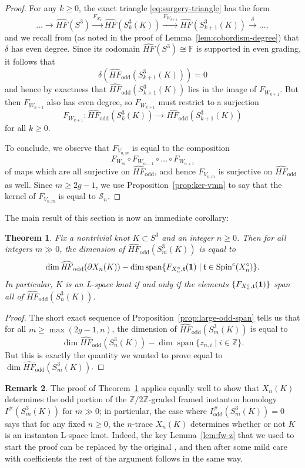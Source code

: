 \documentclass[11pt]{amsart}
\newtheorem {theorem}{Theorem}
\numberwithin{equation}{section}
\numberwithin{theorem}{section}
\theoremstyle{definition}
\newtheorem{remark}[theorem]{Remark}
\newcommand{\Z}{\mathbb{Z}}
\newcommand{\F}{\mathbb{F}}
\newcommand{\spc}{\operatorname{Spin}^c}
\newcommand{\spint}{\mathfrak{t}}
\newcommand{\cS}{\mathcal{S}}
\DeclareMathOperator{\Span}{span}
\newcommand{\hfhat}{\widehat{\mathit{HF}}}
\newcommand{\godd}{\mathrm{odd}}
\begin{document}
\begin{proof}
For any $k \geq 0$, the exact triangle \eqref{eq:surgery-triangle} has the form
\[ \dots \to \hfhat(S^3) \xrightarrow{F_{X^\circ_k}} \hfhat(S^3_k(K)) \xrightarrow{F_{W_{k+1}}} \hfhat(S^3_{k+1}(K)) \xrightarrow{\delta} \dots, \]
and we recall from \cite[\S42.3]{km-book} (as noted in the proof of Lemma~\ref{lem:cobordism-degree}) that $\delta$ has even degree.  Since its codomain $\hfhat(S^3) \cong \F$ is supported in even grading, it follows that
\[ \delta\left(\hfhat_\godd(S^3_{k+1}(K))\right) = 0 \]
and hence by exactness that $\hfhat_\godd(S^3_{k+1}(K))$ lies in the image of $F_{W_{k+1}}$.  But then $F_{W_{k+1}}$ also has even degree, so $F_{W_{k+1}}$ must restrict to a surjection
\[ F_{W_{k+1}}: \hfhat_\godd(S^3_k(K)) \to \hfhat_\godd(S^3_{k+1}(K)) \]
for all $k \geq 0$.

To conclude, we observe that $F_{V_{n,m}}$ is equal to the composition
\[ F_{W_m} \circ F_{W_{m-1}} \circ \dots \circ F_{W_{n+1}} \]
of maps which are all surjective on $\hfhat_\godd$, and hence $F_{V_{n,m}}$ is surjective on $\hfhat_\godd$ as well.  Since $m \geq 2g-1$, we use Proposition~\ref{prop:ker-vmn} to say that the kernel of $F_{V_{n,m}}$ is equal to $\cS_n$.
\end{proof}

The main result of this section is now an immediate corollary:

\begin{theorem} \label{thm:trace-large-surgery}
Fix a nontrivial knot $K \subset S^3$ and an integer $n\geq 0$.  Then for all integers $m \gg 0$, the dimension of $\hfhat_\godd(S^3_m(K))$ is equal to
\[ \dim \hfhat_\godd(\partial X_n(K)) - \dim \Span \{ F_{X^\circ_n,\spint}({\bf 1}) \mid \spint \in \spc(X^\circ_n) \}. \]
In particular, $K$ is an L-space knot if and only if the elements $\{ F_{X^\circ_n,\spint}({\bf 1}) \}$ span all of $\hfhat_\godd(S^3_n(K))$.
\end{theorem}

\begin{proof}
The short exact sequence of Proposition~\ref{prop:large-odd-span} tells us that for all $m \geq \max(2g-1,n)$, the dimension of $\hfhat_\godd(S^3_m(K))$ is equal to
\[ \dim \hfhat_\godd(S^3_n(K)) - \dim \Span\{z_{n,i} \mid i\in\Z\}. \]
But this is exactly the quantity we wanted to prove equal to $\dim \hfhat_\godd(S^3_m(K))$.
\end{proof}

\begin{remark}
The proof of Theorem~\ref{thm:trace-large-surgery} applies equally well to show that $X_n(K)$ determines the odd portion of the $\Z/2\Z$-graded framed instanton homology $I^\#(S^3_m(K))$ for $m \gg 0$; in particular, the case where $I^\#_\godd(S^3_m(K)) = 0$ says that for any fixed $n\geq 0$, the $n$-trace $X_n(K)$ determines whether or not $K$ is an instanton L-space knot.  Indeed, the key Lemma~\ref{lem:fw-z} that we used to start the proof can be replaced by the original \cite[Proposition~7.1]{bs-lspace}, and then after some mild care with coefficients the rest of the argument follows in the same way.
\end{remark}
\end{document}
